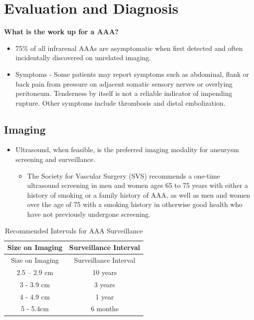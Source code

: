 \documentclass[
]{book}
\providecommand{\tightlist}{%
  \setlength{\itemsep}{0pt}\setlength{\parskip}{0pt}}
\begin{document}
\hypertarget{evaluation-and-diagnosis}{%
\section{Evaluation and Diagnosis}\label{evaluation-and-diagnosis}}

\textbf{What is the work up for a AAA?}
\citep{mooreVascularEndovascularSurgery2019}

\begin{itemize}
\item
  75\% of all infrarenal AAAs are asymptomatic when first detected and
  often incidentally discovered on unrelated imaging.
\item
  Symptoms - Some patients may report symptoms such as abdominal,
  flank or back pain from pressure on adjacent somatic sensory nerves
  or overlying peritoneum. Tenderness by itself is not a reliable
  indicator of impending rupture. Other symptoms include thrombosis
  and distal embolization.
\end{itemize}

\hypertarget{imaging}{%
\subsection{Imaging}\label{imaging}}

\begin{itemize}
\item
  Ultrasound, when feasible, is the preferred imaging modality for
  aneurysm screening and surveillance.

  \begin{itemize}
  \tightlist
  \item
    The Society for Vascular Surgery (SVS) recommends a one-time
    ultrasound screening in men and women ages 65 to 75 years with
    either a history of smoking or a family history of AAA, as well
    as men and women over the age of 75 with a smoking history in
    otherwise good health who have not previously undergone
    screening. \citep{chaikofSocietyVascularSurgery2018a}
  \end{itemize}
\end{itemize}

\begin{longtable}[]{@{}cc@{}}
\caption{Recommended Intervals for AAA Surveillance}\tabularnewline
\toprule
Size on Imaging & Surveillance Interval \\
\midrule
\endfirsthead
\toprule
Size on Imaging & Surveillance Interval \\
\midrule
\endhead
2.5 -- 2.9 cm & 10 years \\
3 - 3.9 cm & 3 years \\
4 - 4.9 cm & 1 year \\
5 - 5.4cm & 6 months \\
\bottomrule
\end{longtable}
\end{document}
